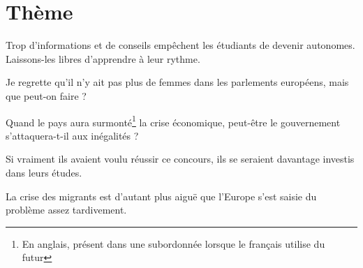 \documentclass[a4paper,english,bookmarks]{article}
\begin{document}
\newboxans

\newcommand{\wordcount}[1]{\reversemarginpar\marginnote{\color{white5}#1}\normalmarginpar}

\hfill\newline

\section*{\centering\EBGaramond\Large Thème}

\begin{enumerate}
    \begin{minipage}[t]{0.45\linewidth}
        \item Trop d'informations et de conseils empêchent les étudiants de devenir autonomes. Laissons-les libres d'apprendre à leur rythme.
    
    
        \item Je regrette qu'il n'y ait pas plus de femmes dans les parlements européens, mais que peut-on faire ?
    
    
        \item Quand le pays aura surmonté\footnote{En anglais, présent dans une subordonnée lorsque le français utilise du futur} la crise économique, peut-être le gouvernement s'attaquera-t-il aux inégalités ?
    
    \end{minipage}
    \hfill
    \begin{minipage}[t]{0.45\linewidth}
        \item Si vraiment ils avaient voulu réussir ce concours, ils se seraient davantage investis dans leurs études.
    
    
        \item La crise des migrants est d'autant plus aiguë que l'Europe s'est saisie du problème assez tardivement.
    

\end{minipage}
\end{enumerate}
\end{document}
